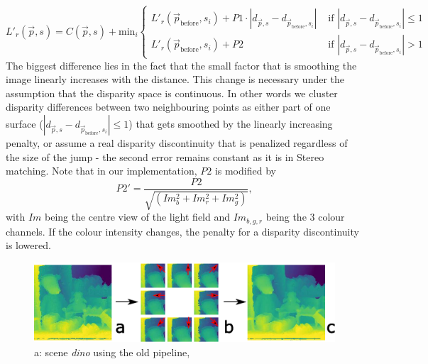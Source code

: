 \documentclass  [
  paper    = a4,
  BCOR     = 10mm,
  twoside,
  fontsize = 12pt,
  fleqn,
  toc      = bibnumbered,
  toc      = listofnumbered,
  numbers  = noendperiod,
  headings = normal,
  listof   = leveldown,
  version  = 3.03
]                                       {scrreprt}
\begin{document}
\begin{equation}\label{eq:recursive1d}
L'_r(\vec{p}, s) = C(\vec{p}, s) + \text{min}_i
\begin{cases}
L'_r(\vec{p}_\text{before}, s_i)+P1 \cdot |d_{\vec p, s} - d_{\vec{p}_\text{before}, s_i}|  & \text{ if }|d_{\vec p, s} - d_{\vec{p}_\text{before}, s_i}| \leq 1 \\
L'_r(\vec{p}_\text{before}, s_i)+P2 & \text{ if }|d_{\vec p, s} - d_{\vec{p}_\text{before}, s_i}| > 1
\end{cases}
\end{equation} 
The biggest difference lies in the fact that the small factor that is smoothing the image linearly increases with the distance. This change is necessary under the assumption that the disparity space is continuous. In other words we cluster disparity differences between two neighbouring points as either part of one surface ($|d_{\vec p, s} - d_{\vec{p}_\text{before}, s_i}| \leq 1$) that gets smoothed by the linearly increasing penalty, or assume a real disparity discontinuity that is penalized regardless of the size of the jump - the second error remains constant as it is in Stereo matching. Note that in our implementation, $P2$ is modified by 
\begin{equation}\label{eq:gradientp2}
P2' =  \frac{P2}{\sqrt{(Im_b^2 +Im_r^2 + Im_g^2)}},
\end{equation}
with $Im$ being the centre view of the light field and $Im_{b,g,r}$ being the 3 colour channels. If the colour intensity changes, the penalty for a disparity discontinuity is lowered.

\begin{figure}
	\centering
	\includegraphics[width=1\linewidth]{images/subplot_sgm}
	\caption[SGM from different directions]{a: scene \textit{dino} using the old pipeline,}
	\label{fig:subplotsgm}
\end{figure}
\end{document}
